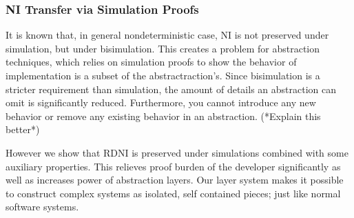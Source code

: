 \documentclass[onecolumn]{paper}
\begin{document}
\subsubsection*{NI Transfer via Simulation Proofs}
It is known that, in general nondeterministic case, NI is not preserved under simulation, but under bisimulation. This creates a problem for abstraction techniques, which relies on simulation proofs to show the behavior of implementation is a subset of the abstractraction's. Since bisimulation is a stricter requirement than simulation, the amount of details an abstraction can omit is significantly reduced. Furthermore, you cannot introduce any new behavior or remove any existing behavior in an abstraction. (*Explain this better*)

However we show that RDNI is preserved under simulations combined with some auxiliary properties. This relieves proof burden of the developer significantly as well as increases power of abstraction layers. Our layer system makes it possible to construct complex systems as isolated, self contained pieces; just like normal software systems.

\end{document}
